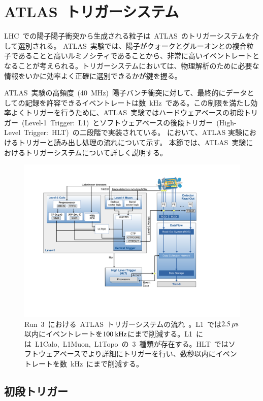 \section{ATLAS~トリガーシステム}\label{sec:ttri}
LHC~での陽子陽子衝突から生成される粒子は~ATLAS~のトリガーシステムを介して選別される。
ATLAS~実験では、陽子がクォークとグルーオンとの複合粒子であることと高いルミノシティであることから、非常に高いイベントレートとなることが考えられる。トリガーシステムにおいては、物理解析のために必要な情報をいかに効率よく正確に選別できるかが鍵を握る。

ATLAS~実験の高頻度~(40~MHz)~陽子バンチ衝突に対して、最終的にデータとしての記録を許容できるイベントレートは数~kHz~である。この制限を満たし効率よくトリガーを行うために、ATLAS~実験ではハードウェアベースの初段トリガー~(Level-1~Trigger:~L1)~とソフトウェアベースの後段トリガー~(High-Level~Trigger:~HLT)~の二段階で実装されている。
において、ATLAS 実験におけるトリガーと読み出し処理の流れについて示す。
本節では、ATLAS~実験におけるトリガーシステムについて詳しく説明する。
\begin{figure}[tbp]
        \centering   
            \includegraphics[width=\textwidth,page=2]{img/pdf/tdaq-run3-schematic-withoutFTK.pdf}
        \caption[Run~3~における~ATLAS~トリガーシステムの流れ]{Run~3~における~ATLAS~トリガーシステムの流れ~\cite{URL:07}。L1~では$2.5~\mu\rm{s}$以内にイベントレートを$100~\rm{kHz}$にまで削減する。L1~には~L1Calo,~L1Muon,~L1Topo~の~3~種類が存在する。HLT~ではソフトウェアベースでより詳細にトリガーを行い、数秒以内にイベントレートを数~kHz~にまで削減する。}\label{fig:trigger}
\end{figure}

\subsection{初段トリガー}\label{subsec:l1tri}
